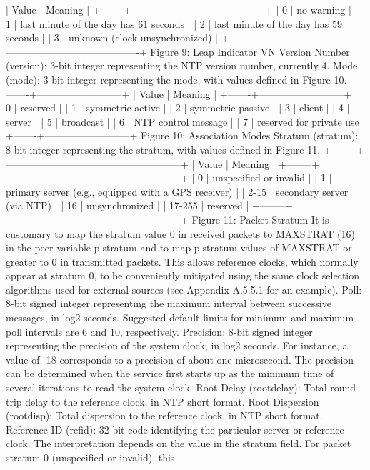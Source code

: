  | Value | Meaning |
 +-------+----------------------------------------+
 | 0 | no warning |
 | 1 | last minute of the day has 61 seconds |
 | 2 | last minute of the day has 59 seconds |
 | 3 | unknown (clock unsynchronized) |
 +-------+----------------------------------------+
 Figure 9: Leap Indicator
 VN Version Number (version): 3-bit integer representing the NTP
 version number, currently 4.
 Mode (mode): 3-bit integer representing the mode, with values defined
 in Figure 10.
 +-------+--------------------------+
 | Value | Meaning |
 +-------+--------------------------+
 | 0 | reserved |
 | 1 | symmetric active |
 | 2 | symmetric passive |
 | 3 | client |
 | 4 | server |
 | 5 | broadcast |
 | 6 | NTP control message |
 | 7 | reserved for private use |
 +-------+--------------------------+
 Figure 10: Association Modes
 Stratum (stratum): 8-bit integer representing the stratum, with
 values defined in Figure 11.
 +--------+-----------------------------------------------------+
 | Value | Meaning |
 +--------+-----------------------------------------------------+
 | 0 | unspecified or invalid |
 | 1 | primary server (e.g., equipped with a GPS receiver) |
 | 2-15 | secondary server (via NTP) |
 | 16 | unsynchronized |
 | 17-255 | reserved |
 +--------+-----------------------------------------------------+
 Figure 11: Packet Stratum
 It is customary to map the stratum value 0 in received packets to
 MAXSTRAT (16) in the peer variable p.stratum and to map p.stratum
 values of MAXSTRAT or greater to 0 in transmitted packets. This
 allows reference clocks, which normally appear at stratum 0, to be
 conveniently mitigated using the same clock selection algorithms used
 for external sources (see Appendix A.5.5.1 for an example).
 Poll: 8-bit signed integer representing the maximum interval between
 successive messages, in log2 seconds. Suggested default limits for
 minimum and maximum poll intervals are 6 and 10, respectively.
 Precision: 8-bit signed integer representing the precision of the
 system clock, in log2 seconds. For instance, a value of -18
 corresponds to a precision of about one microsecond. The precision
 can be determined when the service first starts up as the minimum
 time of several iterations to read the system clock.
Root Delay (rootdelay): Total round-trip delay to the reference
 clock, in NTP short format.
 Root Dispersion (rootdisp): Total dispersion to the reference clock,
 in NTP short format.
 Reference ID (refid): 32-bit code identifying the particular server
 or reference clock. The interpretation depends on the value in the
 stratum field. For packet stratum 0 (unspecified or invalid), this
